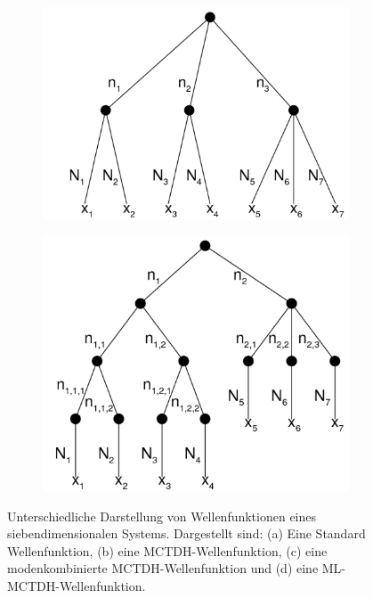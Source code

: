 \begin{figure}
\begin{minipage}{0.45\textwidth}
    \begin{subfigure}{\textwidth}
        \caption{}\label{fig:mode_wave}
        \includegraphics[width=\textwidth]{figures/mctdh_wave2}
    \end{subfigure}
    \quad
    \begin{subfigure}{\textwidth}
        \caption{}\label{fig:multi_mctdh_wave}
        \includegraphics[width=\textwidth]{figures/multi_mctdh_wave}
    \end{subfigure}
\end{minipage}
  \caption{Unterschiedliche Darstellung von Wellenfunktionen eines siebendimensionalen Systems. Dargestellt sind: (a) Eine Standard Wellenfunktion,
  (b) eine MCTDH-Wellenfunktion, (c) eine modenkombinierte MCTDH-Wellenfunktion und (d) eine ML-MCTDH-Wellenfunktion.}\label{fig:tree}
\end{figure}


